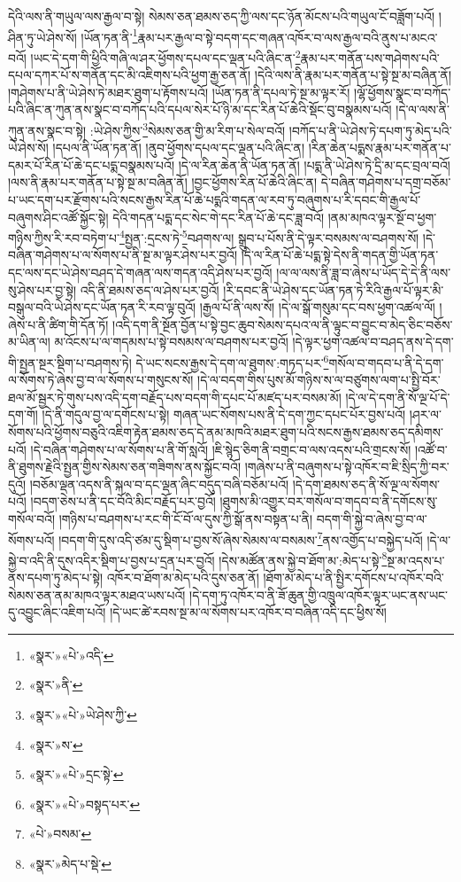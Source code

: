 དེའི་ལས་ནི་གཡུལ་ལས་རྒྱལ་བ་སྟེ། སེམས་ཅན་ཐམས་ཅད་ཀྱི་ལས་དང་ཉོན་མོངས་པའི་གཡུལ་ངོ་བཟློག་པའོ། །ཤིན་ཏུ་ཡེ་ཤེས་སོ། །ཡོན་ཏན་ནི་\footnote{«སྣར་»«པེ་»འདི་}རྣམ་པར་རྒྱལ་བ་སྟེ་བདག་དང་གཞན་འཁོར་བ་ལས་རྒྱལ་བའི་ནུས་པ་མངའ་བའོ། །ཡང་དེ་དག་གི་ཕྱིའི་གཞི་ལ་ཤར་ཕྱོགས་དཔལ་དང་ལྡན་པའི་ཞིང་ན་\footnote{«སྣར་»ནི་}རྣམ་པར་གནོན་པས་གཤེགས་པའི་དཔལ་དཀར་པོ་ས་གནོན་དང་མི་འཇིགས་པའི་ཕྱག་རྒྱ་ཅན་ནོ། །དེའི་ལས་ནི་རྣམ་པར་གནོན་པ་སྟེ་སྔ་མ་བཞིན་ནོ། །གཤེགས་པ་ནི་ཡེ་ཤེས་ཏེ་མཐར་ཐུག་པ་རྟོགས་པའོ། །ཡོན་ཏན་ནི་དཔལ་ཏེ་སྔ་མ་ལྟར་རོ། །ལྷོ་ཕྱོགས་སྣང་བ་བཀོད་པའི་ཞིང་ན་ཀུན་ནས་སྣང་བ་བཀོད་པའི་དཔལ་སེར་པོ་ཉི་མ་དང་རིན་པོ་ཆེའི་སྡོང་བུ་བསྣམས་པའོ། །དེ་ལ་ལས་ནི་ཀུན་ནས་སྣང་བ་སྟེ། :ཡེ་ཤེས་ཀྱིས་\footnote{«སྣར་»«པེ་»ཡེ་ཤེས་ཀྱི་}སེམས་ཅན་གྱི་མ་རིག་པ་སེལ་བའོ། །བཀོད་པ་ནི་ཡེ་ཤེས་ཏེ་དཔག་ཏུ་མེད་པའི་ཡེ་ཤེས་སོ། །དཔལ་ནི་ཡོན་ཏན་ནོ། །ནུབ་ཕྱོགས་དཔལ་དང་ལྡན་པའི་ཞིང་ན། །རིན་ཆེན་པདྨས་རྣམ་པར་གནོན་པ་དམར་པོ་རིན་པོ་ཆེ་དང་པདྨ་བསྣམས་པའོ། །དེ་ལ་རིན་ཆེན་ནི་ཡོན་ཏན་ནོ། །པདྨ་ནི་ཡེ་ཤེས་ཏེ་དྲི་མ་དང་བྲལ་བའོ། །ལས་ནི་རྣམ་པར་གནོན་པ་སྟེ་སྔ་མ་བཞིན་ནོ། །བྱང་ཕྱོགས་རིན་པོ་ཆེའི་ཞིང་ན། དེ་བཞིན་གཤེགས་པ་དགྲ་བཅོམ་པ་ཡང་དག་པར་རྫོགས་པའི་སངས་རྒྱས་རིན་པོ་ཆེ་པདྨའི་གདན་ལ་རབ་ཏུ་བཞུགས་པ་རི་དབང་གི་རྒྱལ་པོ་བཞུགས་ཤིང་འཚོ་སྐྱོང་སྟེ། དེའི་གདན་པདྨ་དང་སེང་གེ་དང་རིན་པོ་ཆེ་དང་ཟླ་བའོ། །ནམ་མཁའ་ལྟར་སྔོ་བ་ཕྱག་གཉིས་ཀྱིས་རི་རབ་བཏེག་པ་\footnote{«སྣར་»ས་}སྤྱན་:དྲངས་ཏེ་\footnote{«སྣར་»«པེ་»དྲང་སྟེ་}བཤགས་ལ། སྒྲུབ་པ་པོས་ནི་དེ་ལྟར་བསམས་ལ་བཤགས་སོ། །དེ་བཞིན་གཤེགས་པ་ལ་སོགས་པ་ནི་སྔ་མ་ལྟར་ཤེས་པར་བྱའོ། །དེ་ལ་རིན་པོ་ཆེ་པདྨ་སྟེ་དེས་ནི་གདན་གྱི་ཡོན་ཏན་དང་ལས་དང་ཡེ་ཤེས་བཤད་དེ་གཞན་ལས་གདན་འདི་ཤེས་པར་བྱའོ། །ལ་ལ་ལས་ནི་ཟླ་བ་ཞེས་པ་ཡོད་དེ་དེ་ནི་ལས་སུ་ཤེས་པར་བྱ་སྟེ། འདི་ནི་ཐམས་ཅད་ལ་ཤེས་པར་བྱའོ། །རི་དབང་ནི་ཡེ་ཤེས་དང་ཡོན་ཏན་ཏེ་རིའི་རྒྱལ་པོ་ལྟར་མི་བསྒུལ་བའི་ཡེ་ཤེས་དང་ཡོན་ཏན་རི་རབ་ལྟ་བུའོ། །རྒྱལ་པོ་ནི་ལས་སོ། །དེ་ལ་སྒོ་གསུམ་དང་བས་ཕྱག་འཚལ་ལོ། །ཞེས་པ་ནི་ཚིག་གི་དོན་ཏོ། །འདི་དག་ནི་སྔོན་བྱོན་པ་སྟེ་བྱང་ཆུབ་སེམས་དཔའ་ལ་ནི་ལྟུང་བ་བྱུང་བ་མེད་ཅིང་བཅོས་མ་ཡིན་ལ། མ་འོངས་པ་ལ་གདམས་པ་སྟེ་བསམས་ལ་བཤགས་པར་བྱའོ། །དེ་ལྟར་ཕྱག་འཚལ་བ་བཤད་ནས་དེ་དག་གི་སྤྱན་སྔར་སྡིག་པ་བཤགས་ཏེ། དེ་ཡང་སངས་རྒྱས་དེ་དག་ལ་ཐུགས་:གཏད་པར་\footnote{«སྣར་»«པེ་»བསྟད་པར་}གསོལ་བ་གདབ་པ་ནི་དེ་དག་ལ་སོགས་ཏེ་ཞེས་བྱ་བ་ལ་སོགས་པ་གསུངས་སོ། །དེ་ལ་བདག་གིས་པུས་མོ་གཉིས་ས་ལ་བཙུགས་ལག་པ་སྤྱི་བོར་ཐལ་མོ་སྦྱར་ཏེ་གུས་པས་འདི་དག་བརྗོད་པས་བདག་གི་དཔང་པོ་མཛད་པར་བསམ་མོ། །དེ་ལ་དེ་དག་ནི་སོ་ལྔ་པོ་དེ་དག་གོ། །དེ་ནི་གདུལ་བྱ་ལ་དགོངས་པ་སྟེ། གཞན་ཡང་སོགས་པས་ནི་དེ་དག་ཀྱང་དཔང་པོར་བྱས་པའོ། །ཤར་ལ་སོགས་པའི་ཕྱོགས་བཅུའི་འཇིག་རྟེན་ཐམས་ཅད་དེ་ནམ་མཁའི་མཐར་ཐུག་པའི་སངས་རྒྱས་ཐམས་ཅད་དམིགས་པའོ། །དེ་བཞིན་གཤེགས་པ་ལ་སོགས་པ་ནི་གོ་སླའོ། །ཇི་སྙེད་ཅིག་ནི་བགྲང་བ་ལས་འདས་པའི་གྲངས་སོ། །འཚོ་བ་ནི་ཐུགས་རྗེའི་སྤྱན་གྱིས་སེམས་ཅན་གཟིགས་ནས་སྐྱོང་བའོ། །གཞེས་པ་ནི་བཞུགས་པ་སྟེ་འཁོར་བ་ཇི་སྲིད་ཀྱི་བར་དུའོ། །བཅོམ་ལྡན་འདས་ནི་སྐལ་བ་དང་ལྡན་ཞིང་བདུད་བཞི་བཅོམ་པའོ། །དེ་དག་ཐམས་ཅད་ནི་སོ་ལྔ་ལ་སོགས་པའོ། །བདག་ཅེས་པ་ནི་དང་བོའི་མིང་བརྗོད་པར་བྱའོ། །ཐུགས་མི་འགྱུར་བར་གསོལ་བ་གདབ་བ་ནི་དགོངས་སུ་གསོལ་བའོ། །གཉིས་པ་བཤགས་པ་རང་གི་ངོ་བོ་ལ་དུས་ཀྱི་སྒོ་ནས་བསྟན་པ་ནི། བདག་གི་སྐྱེ་བ་ཞེས་བྱ་བ་ལ་སོགས་པའོ། །བདག་གི་དུས་འདི་ཙམ་དུ་སྡིག་པ་བྱས་སོ་ཞེས་སེམས་ལ་བསམས་\footnote{«པེ་»བསམ་}ནས་འགྱོད་པ་བསྐྱེད་པའོ། །དེ་ལ་སྐྱེ་བ་འདི་ནི་དུས་འདིར་སྡིག་པ་བྱས་པ་དྲན་པར་བྱའོ། །དེས་མཚོན་ནས་སྐྱེ་བ་ཐོག་མ་:མེད་པ་སྟེ་\footnote{«སྣར་»མེད་པ་སྡེ་}སྔ་མ་འདས་པ་ནས་དཔག་ཏུ་མེད་པ་སྟེ། འཁོར་བ་ཐོག་མ་མེད་པའི་དུས་ཅན་ནོ། །ཐོག་མ་མེད་པ་ནི་སྤྱིར་དགོངས་པ་འཁོར་བའི་སེམས་ཅན་ནམ་མཁའ་ལྟར་མཐའ་ཡས་པའོ། །དེ་དག་ཏུ་འཁོར་བ་ནི་ཟོ་ཆུན་གྱི་འཁྲུལ་འཁོར་ལྟར་ཡང་ནས་ཡང་དུ་འབྱུང་ཞིང་འཇིག་པའོ། །དེ་ཡང་ཚེ་རབས་སྔ་མ་ལ་སོགས་པར་འཁོར་བ་བཞིན་འདི་དང་ཕྱིས་སོ། 